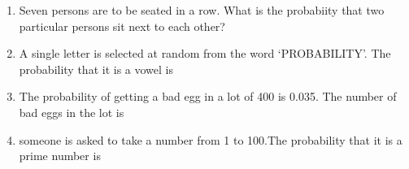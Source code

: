 \begin{enumerate}[label=\thesection.\arabic*,ref=\thesection.\theenumi]
\solution

\item Seven persons are to be seated in a row. What is the probabiity that two particular persons sit next to each other?\\
\solution

\item A single letter is selected at random from the word ‘PROBABILITY’. The
probability that it is a vowel is

\item The probability of getting a bad egg in a lot of 400 is 0.035. The number of bad eggs in the lot is\\
\solution

\item someone is asked to take a number from 1 to 100.The probability that it is a prime number is\\
\solution

    \end{enumerate}

